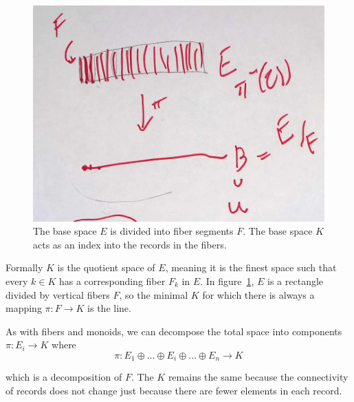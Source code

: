 \documentclass[../main.tex]{subfiles}
\begin{document}
\begin{figure}[H]
    \includegraphics[width=.5\linewidth]{figures/math/k_qspace.png}
    \caption{The base space $E$ is divided into fiber segments $F$. The base space $K$ acts as an index into the records in the fibers.
    }
    \label{fig:base_space_div}
\end{figure}

Formally $K$ is the quotient space \cite{QuotientSpaceTopology2020} of $E$, meaning it is the finest space\cite{aurouxMath131Introduction} such that every $k \in K$ has a corresponding fiber $F_k$ in $E$\cite{QuotientSpaceTopology2020}. In figure~\ref{fig:base_space_div}, $E$ is a rectangle divided by vertical fibers $F$, so the minimal $K$ for which there is always a mapping $\pi: F\rightarrow K$ is the line. 

As with fibers and monoids, we can decompose the total space into components $\pi:E_i\rightarrow K$ where
\begin{equation}
    \pi:E_1\oplus\ldots\oplus E_i \oplus\ldots \oplus E_n \rightarrow K
\end{equation}

which is a decomposition of $F$. The $K$ remains the same because the connectivity of records 
does not change just because there are fewer elements in each record.
\end{document}
